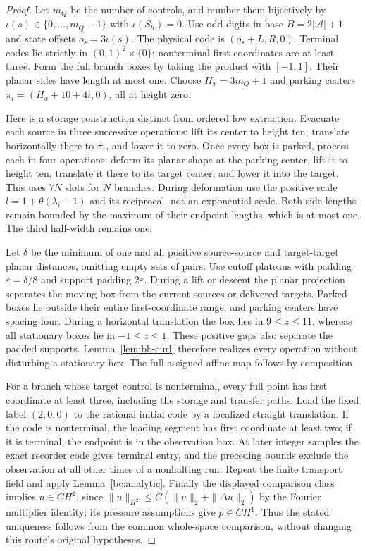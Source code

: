 \begin{proof}
Let $m_Q$ be the number of controls, and number them bijectively by
$\iota(s)\in\{0,\ldots,m_Q-1\}$ with $\iota(S_h)=0$.
Use odd digits in base $B=2|\mathcal A|+1$ and state offsets
$o_s=3\iota(s)$. The physical
code is $(o_s+L,R,0)$. Terminal codes lie strictly in $(0,1)^2\times\{0\}$;
nonterminal first coordinates are at least three. Form the full branch
boxes by taking the product with $[-1,1]$. Their planar sides have length
at most one. Choose $H_x=3m_Q+1$ and
parking centers $\pi_i=(H_x+10+4i,0)$, all at height zero.

Here is a storage construction distinct from ordered low extraction.
Evacuate each source in three successive operations: lift its center to
height ten, translate horizontally there to $\pi_i$, and lower it to
zero. Once every box is parked, process each in four operations: deform
its planar shape at the parking center, lift it to height ten, translate
it there to its target center, and lower it into the target. This uses
$7N$ slots for $N$ branches. During deformation use the positive scale
$l=1+\theta(\lambda_i-1)$ and its reciprocal, not an exponential scale.
Both side lengths remain bounded by the maximum of their endpoint lengths,
which is at most one. The third half-width remains one.

Let $\delta$ be the minimum of one and all positive source-source and
target-target planar distances, omitting empty sets of pairs. Use cutoff
plateaus with padding $\varepsilon=\delta/8$ and support padding
$2\varepsilon$. During a lift or descent the planar projection separates
the moving box from the current sources or delivered targets. Parked
boxes lie outside their entire first-coordinate range, and parking centers
have spacing four. During a horizontal translation the box lies in
$9\le z\le11$, whereas all stationary boxes lie in $-1\le z\le1$.
These positive gaps also separate the padded supports. Lemma~\ref{lem:bb-curl}
therefore realizes every operation without disturbing a stationary box.
The full assigned affine map follows by composition.

For a branch whose target control is nonterminal, every full point has
first coordinate at least three, including the storage and transfer paths.
Load the fixed label
$(2,0,0)$ to the rational initial code by a localized straight translation.
If the code is nonterminal, the loading segment has first coordinate at
least two; if it is terminal, the endpoint is in the observation box.
At later integer samples the exact recorder code gives terminal entry,
and the preceding bounds exclude the observation at all other times of a
nonhalting run. Repeat the finite transport field and apply
Lemma~\ref{bc:analytic}. Finally the displayed comparison class implies
$u\in C H^2$, since $\|u\|_{H^2}\le C(\|u\|_2+\|\Delta u\|_2)$
by the Fourier multiplier identity; its pressure assumptions give $p\in C H^1$.
Thus the stated uniqueness follows from the common whole-space comparison,
without changing this route's original hypotheses.
\end{proof}

